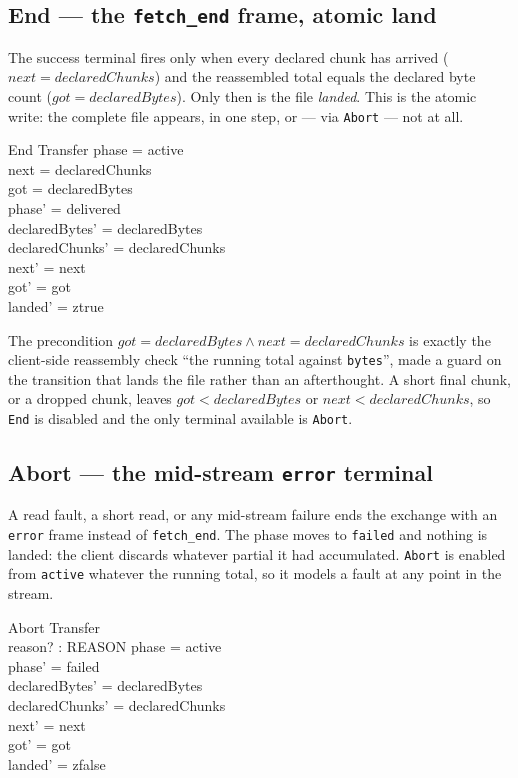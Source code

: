 \documentclass[a4paper,10pt,fleqn]{article}
\begin{document}
\subsection{End --- the \texttt{fetch\_end} frame, atomic land}

The success terminal fires only when every declared chunk has arrived
($next = declaredChunks$) and the reassembled total equals the declared byte
count ($got = declaredBytes$). Only then is the file \emph{landed}. This is the
atomic write: the complete file appears, in one step, or --- via \texttt{Abort}
--- not at all.

\begin{schema}{End}
  \Delta Transfer
  \where
  phase = active \\
  next = declaredChunks \\
  got = declaredBytes \\
  phase' = delivered \\
  declaredBytes' = declaredBytes \\
  declaredChunks' = declaredChunks \\
  next' = next \\
  got' = got \\
  landed' = ztrue
\end{schema}

The precondition $got = declaredBytes \land next = declaredChunks$ is exactly the
client-side reassembly check ``the running total against \texttt{bytes}'', made a
guard on the transition that lands the file rather than an afterthought. A short
final chunk, or a dropped chunk, leaves $got < declaredBytes$ or $next <
declaredChunks$, so \texttt{End} is disabled and the only terminal available is
\texttt{Abort}.

\subsection{Abort --- the mid-stream \texttt{error} terminal}

A read fault, a short read, or any mid-stream failure ends the exchange with an
\texttt{error} frame instead of \texttt{fetch\_end}. The phase moves to
\texttt{failed} and nothing is landed: the client discards whatever partial it
had accumulated. \texttt{Abort} is enabled from \texttt{active} whatever the
running total, so it models a fault at any point in the stream.

\begin{schema}{Abort}
  \Delta Transfer \\
  reason? : REASON
  \where
  phase = active \\
  phase' = failed \\
  declaredBytes' = declaredBytes \\
  declaredChunks' = declaredChunks \\
  next' = next \\
  got' = got \\
  landed' = zfalse
\end{schema}
\end{document}
